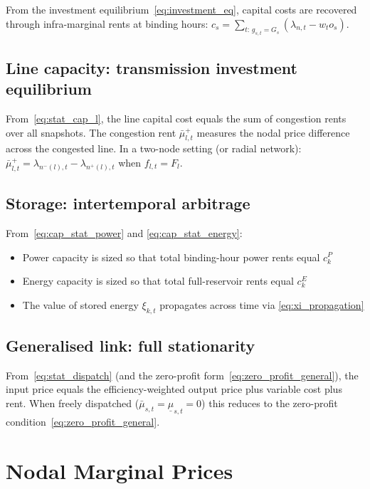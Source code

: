 \documentclass{article}
\begin{document}
From the investment equilibrium~\eqref{eq:investment_eq}, capital costs are
recovered through infra-marginal rents at binding hours:
$c_s = \sum_{t:\, g_{s,t} = G_s} (\lambda_{n,t} - w_t o_s)$.

\subsection{Line capacity: transmission investment equilibrium}

From~\eqref{eq:stat_cap_l}, the line capital cost equals the sum of congestion
rents over all snapshots.
The congestion rent $\bar{\mu}^+_{l,t}$ measures the nodal price difference
across the congested line. In a two-node setting (or radial network):
$\bar{\mu}^+_{l,t} = \lambda_{n^-(l),t} - \lambda_{n^+(l),t}$ when $f_{l,t} = F_l$.

\subsection{Storage: intertemporal arbitrage}

From~\eqref{eq:cap_stat_power} and \eqref{eq:cap_stat_energy}:
\begin{itemize}
    \item Power capacity is sized so that total binding-hour power rents equal $c^P_k$
    \item Energy capacity is sized so that total full-reservoir rents equal $c^E_k$
    \item The value of stored energy $\xi_{k,t}$ propagates across time via
          \eqref{eq:xi_propagation}
\end{itemize}

\subsection{Generalised link: full stationarity}

From~\eqref{eq:stat_dispatch} (and the zero-profit form~\eqref{eq:zero_profit_general}),
the input price equals the efficiency-weighted output price plus variable cost plus rent.
When freely dispatched ($\bar{\mu}_{s,t} = \underline{\mu}_{s,t} = 0$) this reduces to
the zero-profit condition~\eqref{eq:zero_profit_general}.

\section{Nodal Marginal Prices}
\label{sec:lmp}
\end{document}
